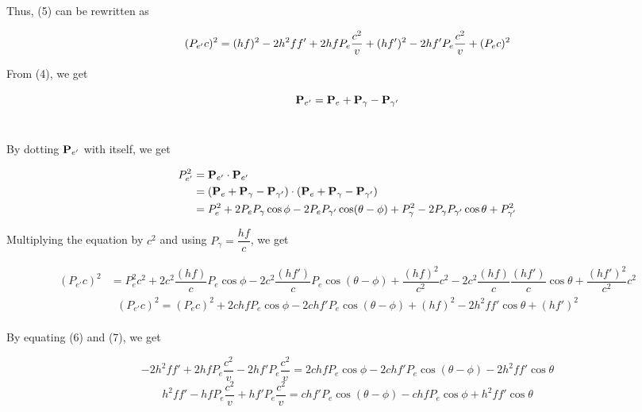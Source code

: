 \documentclass{article}
\begin{document}
\noindent Thus, (5) can be rewritten as

\begin{equation}
(P_{e'}c)^2 = (hf)^2 - 2h^2ff' + 2hfP_e\dfrac{c^2}{v} + (hf')^2 - 2hf'P_e\dfrac{c^2}{v} + (P_ec)^2 \\
\end{equation}

\noindent From (4), we get

\begin{equation*}
\vb P_{e'} = \vb P_{e} + \vb P_{\gamma} - \vb P_{\gamma'}
\end{equation*} \

\noindent By dotting $\vb P_{e'}$ with itself, we get

\begin{equation*}
\begin{split}
P_{e'}^2 &= \vb P_{e'} \cdot \vb P_{e'} \\
&= (\vb P_{e} + \vb P_{\gamma} - \vb P_{\gamma'}) \cdot (\vb P_{e} + \vb P_{\gamma} - \vb P_{\gamma'}) \\
&= P_{e}^2 + 2P_{e}P_{\gamma}\cos\phi - 2P_{e}P_{\gamma'}\cos(\theta - \phi) + P_{\gamma}^2 - 2P_{\gamma}P_{\gamma'}\cos\theta + P_{\gamma'}^2\\
\end{split}
\end{equation*}

\noindent Multiplying the equation by $c^2$ and using $P_{\gamma} = \dfrac{hf}{c}$, we get

\begin{equation*}
\begin{split}
(P_{e'}c)^2 &= P_{e}^2c^2 + 2c^2\dfrac{(hf)}{c}P_{e}\cos\phi - 2c^2\dfrac{(hf')}{c}P_{e}\cos(\theta - \phi) + \dfrac{(hf)^2}{c^2}c^2 - 2c^2\dfrac{(hf)}{c}\dfrac{(hf')}{c}\cos\theta + \dfrac{(hf')^2}{c^2}c^2
\end{split}
\end{equation*}
\begin{equation}
\begin{split}
(P_{e'}c)^2 = (P_{e}c)^2 + 2chfP_{e}\cos\phi - 2chf'P_{e}\cos(\theta - \phi) + (hf)^2 - 2h^2ff'\cos\theta + (hf')^2
\end{split}
\end{equation} \\

\noindent By equating (6) and (7), we get

\begin{equation*}
- 2h^2ff' + 2hfP_e\dfrac{c^2}{v} - 2hf'P_e\dfrac{c^2}{v}
= 2chfP_{e}\cos\phi - 2chf'P_{e}\cos(\theta - \phi) - 2h^2ff'\cos\theta
\end{equation*}
\begin{equation}
h^2ff' - hfP_e\dfrac{c^2}{v} + hf'P_e\dfrac{c^2}{v}
= chf'P_{e}\cos(\theta - \phi) - chfP_{e}\cos\phi + h^2ff'\cos\theta
\end{equation}\\
\end{document}
